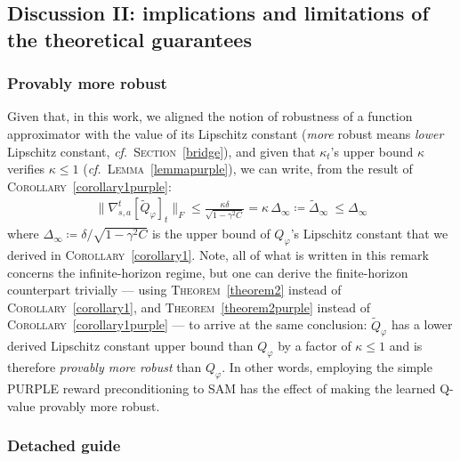 \subsection{Discussion II: implications and limitations of the theoretical guarantees}
\label{discussionpurple}

\subsubsection{Provably more robust}
\label{morerobust}

Given that, in this work, we aligned the notion of robustness of a function approximator
with the value of its Lipschitz constant (\emph{more} robust means \emph{lower} Lipschitz constant,
\textit{cf.}~\textsc{Section}~\ref{bridge}), and given that $\kappa_t$'s upper bound $\kappa$
verifies $\kappa \leq 1$ (\textit{cf.}~\textsc{Lemma}~\ref{lemmapurple}), we can write,
from the result of \textsc{Corollary}~\ref{corollary1purple}:
\begin{align}
\lVert \nabla_{s,a}^t[\widetilde{Q}_\varphi]_t \rVert _F
\leq \frac{\kappa \delta}{\sqrt{1 - \gamma^2 C}}
= \kappa \, \Delta_\infty
\coloneqq \widetilde{\Delta}_\infty
\: \leq \Delta_\infty
\label{tildeqlip}
\end{align}
where $\Delta_\infty \coloneqq \delta / \sqrt{1 - \gamma^2 C}$
is the upper bound of $Q_\varphi$'s Lipschitz constant that we derived in \textsc{Corollary}~\ref{corollary1}.
Note, all of what is written in this remark concerns the infinite-horizon regime,
but one can derive the finite-horizon counterpart trivially --- using
\textsc{Theorem}~\ref{theorem2} instead of \textsc{Corollary}~\ref{corollary1},
and \textsc{Theorem}~\ref{theorem2purple} instead of \textsc{Corollary}~\ref{corollary1purple} ---
to arrive at the same conclusion:
$\widetilde{Q}_\varphi$ has a lower derived Lipschitz constant upper bound than $Q_\varphi$
by a factor of $\kappa \leq 1$ and is therefore \emph{provably more robust} than $Q_\varphi$.
In other words, employing the simple PURPLE reward preconditioning to SAM has the effect of
making the learned Q-value provably more robust.

\subsubsection{Detached guide}

